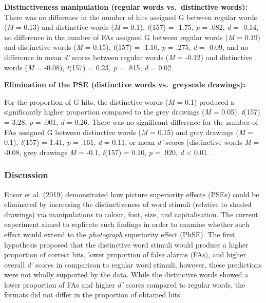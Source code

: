 \documentclass[
  11pt,
]{article}
\begin{document}
\textbf{Distinctiveness manipulation (regular words vs.~distinctive
words):} There was no difference in the number of hits assigned G
between regular words (\emph{M} = 0.13) and distinctive words (\emph{M}
= 0.1), \emph{t}(157) = -1.75, \emph{p} = .082, \emph{d} = -0.14, no
difference in the number of FAs assigned G between regular words
(\emph{M} = 0.19) and distinctive words (\emph{M} = 0.15), \emph{t}(157)
= -1.10, \emph{p} = .275, \emph{d} = -0.09, and no difference in mean
\emph{d'} scores between regular words (\emph{M} = -0.12) and
distinctive words (\emph{M} = -0.08), \emph{t}(157) = 0.23, \emph{p} =
.815, \emph{d} = 0.02.

\textbf{Elimination of the PSE (distinctive words vs.~greyscale
drawings):}

For the proportion of G hits, the distinctive words (\emph{M} = 0.1)
produced a significantly higher proportion compared to the grey drawings
(\emph{M} = 0.05), \emph{t}(157) = 3.28, \emph{p} = .001, \emph{d} =
0.26. There was no significant difference for the number of FAs assigned
G between distinctive words (\emph{M} = 0.15) and grey drawings
(\emph{M} = 0.1), \emph{t}(157) = 1.41, \emph{p} = .161, \emph{d} =
0.11, or mean \emph{d'} scores (distinctive words \emph{M} = -0.08, grey
drawings \emph{M} = -0.1, \emph{t}(157) = 0.10, \emph{p} = .920,
\emph{d} \textless{} 0.01.

\hypertarget{discussion-4}{%
\subsubsection{Discussion}\label{discussion-4}}

Ensor et al. (2019) demonstrated how picture superiority effects (PSEs)
could be eliminated by increasing the distinctiveness of word stimuli
(relative to shaded drawings) via manipulations to colour, font, size,
and capitalisation. The current experiment aimed to replicate such
findings in order to examine whether such effect would extend to the
\emph{photograph} superiority effect (PhSE). The first hypothesis
proposed that the distinctive word stimuli would produce a higher
proportion of correct hits, lower proportion of false alarms (FAs), and
higher overall \emph{d'} scores in comparison to regular word stimuli,
however, these predictions were not wholly supported by the data. While
the distinctive words showed a lower proportion of FAs and higher
\emph{d'} scores compared to regular words, the formats did not differ
in the proportion of obtained hits.
\end{document}
